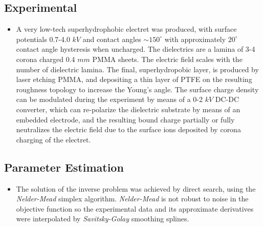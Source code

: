 \documentclass[a4paper, 12pt]{article}
\begin{document}
\subsection{Experimental}
\begin{itemize}
\item A very low-tech superhydrophobic electret was produced, with surface potentials 0.7-4.0 $kV$ and contact angles $\sim 150^{\circ}$ with approximately $20^{\circ}$ contact angle hysteresis when uncharged. The dielectrics are a lamina of 3-4 corona charged 0.4 $mm$ PMMA sheets. The electric field scales with the number of dielectric lamina. The final, superhydropobic layer, is produced by laser etching PMMA, and depositing a thin layer of PTFE on the resulting roughness topology to increase the Young's angle. The surface charge density can be modulated during the experiment by means of a 0-2 $kV$ DC-DC converter, which can re-polarize the dielectric substrate by means of an embedded electrode, and the resulting bound charge partially or fully neutralizes the electric field due to the surface ions deposited by corona charging of the electret.
\end{itemize}   

\subsection{Parameter Estimation}
\begin{itemize}
\item The solution of the inverse problem  was achieved by direct search, using the \emph{Nelder-Mead} simplex algorithm. \emph{Nelder-Mead} is not robust to noise in the objective function so the experimental data and its approximate derivatives were interpolated by \emph{Savitsky-Golay} smoothing splines.
\end{itemize}
\end{document}
